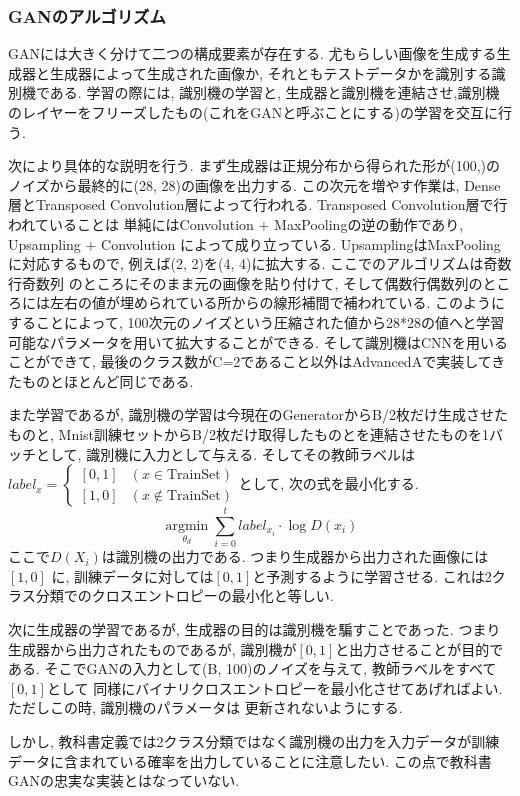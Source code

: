 \documentclass[a4paper,11pt]{jsarticle}
\begin{document}
\subsubsection*{GANのアルゴリズム}
GANには大きく分けて二つの構成要素が存在する.
尤もらしい画像を生成する生成器と生成器によって生成された画像か, それともテストデータかを識別する識別機である.
学習の際には, 識別機の学習と, 生成器と識別機を連結させ,識別機のレイヤーをフリーズしたもの(これをGANと呼ぶことにする)の学習を交互に行う.

次により具体的な説明を行う. まず生成器は正規分布から得られた形が(100,)のノイズから最終的に(28, 28)の画像を出力する.
この次元を増やす作業は, Dense層とTransposed Convolution層によって行われる. Transposed Convolution層で行われていることは
単純にはConvolution + MaxPoolingの逆の動作であり, Upsampling + Convolution によって成り立っている.
UpsamplingはMaxPoolingに対応するもので, 例えば(2, 2)を(4, 4)に拡大する. ここでのアルゴリズムは奇数行奇数列
のところにそのまま元の画像を貼り付けて, そして偶数行偶数列のところには左右の値が埋められている所からの線形補間で補われている.
このようにすることによって, 100次元のノイズという圧縮された値から28*28の値へと学習可能なパラメータを用いて拡大することができる.
そして識別機はCNNを用いることができて, 最後のクラス数がC=2であること以外はAdvancedAで実装してきたものとほとんど同じである.

また学習であるが, 識別機の学習は今現在のGeneratorからB/2枚だけ生成させたものと,
Mnist訓練セットからB/2枚だけ取得したものとを連結させたものを1バッチとして, 識別機に入力として与える.
そしてその教師ラベルは$label_x = \begin{cases}
    [0, 1] & (x\in \text{TrainSet})    \\
    [1, 0] & (x\notin \text{TrainSet})
  \end{cases}$として, 次の式を最小化する.
$$
  \underset{\theta_d}{\operatorname{argmin}}\sum_{i=0}^{t}label_{x_i} \cdot \log D(x_i)
$$
ここで$D(X_i)$は識別機の出力である. つまり生成器から出力された画像には $[1, 0]$
に, 訓練データに対しては$[0, 1]$と予測するように学習させる. これは2クラス分類でのクロスエントロピーの最小化と等しい.

次に生成器の学習であるが, 生成器の目的は識別機を騙すことであった.
つまり生成器から出力されたものであるが, 識別機が$[0, 1]$と出力させることが目的である.
そこでGANの入力として(B, 100)のノイズを与えて, 教師ラベルをすべて$[0, 1]$として
同様にバイナリクロスエントロピーを最小化させてあげればよい. ただしこの時, 識別機のパラメータは
更新されないようにする.

しかし, 教科書定義では2クラス分類ではなく識別機の出力を入力データが訓練データに含まれている確率を出力していることに注意したい.
この点で教科書GANの忠実な実装とはなっていない.
\end{document}
